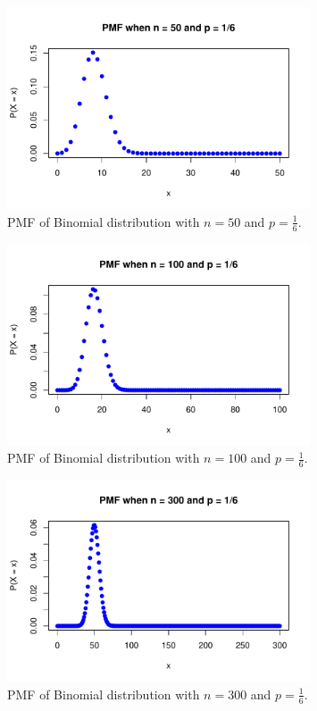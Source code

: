 \begin{figure}[h!]
  \centering
  \includegraphics[width=0.8\textwidth]{Section4/pmf_n50.pdf}
  \caption{PMF of Binomial distribution with \(n = 50\) and \(p = \frac{1}{6}\).}
\end{figure}

\begin{figure}[h!]
  \centering
  \includegraphics[width=0.8\textwidth]{Section4/pmf_n100.pdf}
  \caption{PMF of Binomial distribution with \(n = 100\) and \(p = \frac{1}{6}\).}
\end{figure}

\begin{figure}[h!]
  \centering
  \includegraphics[width=0.8\textwidth]{Section4/pmf_n300.pdf}
  \caption{PMF of Binomial distribution with \(n = 300\) and \(p = \frac{1}{6}\).}
\end{figure}



